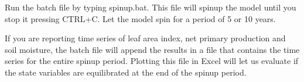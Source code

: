 Run the batch file by typing \textsf{spinup.bat}. This file will spinup the model until you stop it pressing \textsf{CTRL+C}. Let the model spin for a period of 5 or 10 years.

If you are reporting time series of leaf area index, net primary production and soil moisture, the batch file will append the results in a file that contains the time series for the entire spinup period. Plotting this file in Excel will let us evaluate if the state variables are equilibrated at the end of the spinup period. 







  




